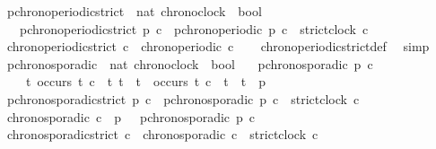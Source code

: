 \begin{isabellebody}
\isanewline
{}\isamarkupfalse%
\ p{\isacharunderscore}chronoperiodic{\isacharunderscore}strict\ {\isacharcolon}{\isacharcolon}\ {\isacartoucheopen}{\isacharbrackleft}nat{\isacharcomma}\ chronoclock{\isacharbrackright}\ {\isasymRightarrow}\ bool{\isacartoucheclose}\isanewline
\ \ \ {\isacartoucheopen}p{\isacharunderscore}chronoperiodic{\isacharunderscore}strict\ p\ c\ {\isasymequiv}\ p{\isacharunderscore}chronoperiodic\ p\ c\ {\isasymand}\ strict{\isacharunderscore}clock\ c{\isacartoucheclose}\isanewline
\isanewline
{}\isamarkupfalse%
\ {\isacartoucheopen}chronoperiodic{\isacharunderscore}strict\ c\ {\isasymLongrightarrow}\ chronoperiodic\ c{\isacartoucheclose}\isanewline
%
\isadelimproof
\ \ %
\endisadelimproof
%
\isatagproof
{}\isamarkupfalse%
\ chronoperiodic{\isacharunderscore}strict{\isacharunderscore}def\ \isamarkupfalse%
\ simp%
\endisatagproof
{\isafoldproof}%
%
\isadelimproof
\isanewline
%
\endisadelimproof
\isanewline
{}\isamarkupfalse%
\ p{\isacharunderscore}chronosporadic\ {\isacharcolon}{\isacharcolon}\ {\isacartoucheopen}{\isacharbrackleft}nat{\isacharcomma}\ chronoclock{\isacharbrackright}\ {\isasymRightarrow}\ bool{\isacartoucheclose}\isanewline
\ \ \ {\isacartoucheopen}p{\isacharunderscore}chronosporadic\ p\ c\ {\isasymequiv}\isanewline
\ \ \ \ {\isasymforall}t{\isachardot}\ occurs\ t\ c\ {\isasymlongrightarrow}\ {\isacharparenleft}{\isasymforall}t{\isacharprime}{\isachardot}\ {\isacharparenleft}t{\isacharprime}\ {\isachargreater}\ t\ {\isasymand}\ occurs\ t{\isacharprime}\ c{\isacharparenright}\ {\isasymlongrightarrow}\ t{\isacharprime}\ {\isachargreater}\ t\ {\isacharplus}\ p{\isacharparenright}{\isacartoucheclose}\isanewline
\isanewline
{}\isamarkupfalse%
\ {\isacartoucheopen}p{\isacharunderscore}chronosporadic{\isacharunderscore}strict\ p\ c\ {\isasymequiv}\ p{\isacharunderscore}chronosporadic\ p\ c\ {\isasymand}\ strict{\isacharunderscore}clock\ c{\isacartoucheclose}\isanewline
\isanewline
{}\isamarkupfalse%
\ {\isacartoucheopen}chronosporadic\ c\ {\isasymequiv}\ {\isacharparenleft}{\isasymexists}p\ {\isachargreater}\ {}{\isachardot}\ p{\isacharunderscore}chronosporadic\ p\ c{\isacharparenright}{\isacartoucheclose}\isanewline
\isanewline
{}\isamarkupfalse%
\ {\isacartoucheopen}chronosporadic{\isacharunderscore}strict\ c\ {\isasymequiv}\ chronosporadic\ c\ {\isasymand}\ strict{\isacharunderscore}clock\ c{\isacartoucheclose}\isanewline

\end{isabellebody}
